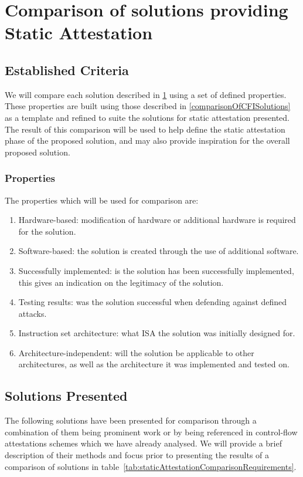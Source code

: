 \section{Comparison of solutions providing Static Attestation} \label{staticAttestationSolutions}

\subsection{Established Criteria}

We will compare each solution described in \ref{staticAttestationSolutions} using a set of defined properties. These properties are built using those described in \ref{comparisonOfCFISolutions} as a template and refined to suite the solutions for static attestation presented. The result of this comparison will be used to help define the static attestation phase of the proposed solution, and may also provide inspiration for the overall proposed solution.

\subsubsection*{Properties}
The properties which will be used for comparison are:
\begin{enumerate}[label=(\arabic*),noitemsep]
	\item Hardware-based: modification of hardware or additional hardware is required for the solution.			\item Software-based: the solution is created through the use of additional software.
	\item Successfully implemented: is the solution has been successfully implemented, this gives an indication on the legitimacy of the solution.
	\item Testing results: was the solution successful when defending against defined attacks.
	\item Instruction set architecture: what ISA the solution was initially designed for.
	\item Architecture-independent: will the solution be applicable to other architectures, as well as the architecture it was implemented and tested on.
\end{enumerate}

\subsection{Solutions Presented}

The following solutions have been presented for comparison through a combination of them being prominent work or by being referenced in control-flow attestations schemes which we have already analysed. We will provide a brief description of their methods and focus prior to presenting the results of a comparison of solutions in table~\ref{tab:staticAttestationComparisonRequirements}.

